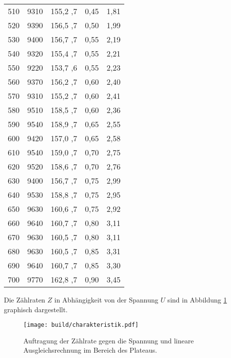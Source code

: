 \begin{table}[htp]
\begin{center}
\begin{tabular}{S[table-format=3.0] S[table-format=4.0,table-figures-uncertainty=3]
       S[table-format=3.1,table-figures-uncertainty=2] S[table-format=1.2] S[table-format=1.2]}
			510 & 9310  & 155,2 ,7 & 0,45 & 1,81\\
			520 & 9390  & 156,5 ,7 & 0,50 & 1,99\\
			530 & 9400  & 156,7 ,7 & 0,55 & 2,19\\
			540 & 9320  & 155,4 ,7 & 0,55 & 2,21\\
			550 & 9220  & 153,7 ,6 & 0,55 & 2,23\\
			560 & 9370  & 156,2 ,7 & 0,60 & 2,40\\
			570 & 9310  & 155,2 ,7 & 0,60 & 2,41\\
			580 & 9510  & 158,5 ,7 & 0,60 & 2,36\\
			590 & 9540  & 158,9 ,7 & 0,65 & 2,55\\
			600 & 9420  & 157,0 ,7 & 0,65 & 2,58\\
			610 & 9540  & 159,0 ,7 & 0,70 & 2,75\\
			620 & 9520  & 158,6 ,7 & 0,70 & 2,76\\
			630 & 9400  & 156,7 ,7 & 0,75 & 2,99\\
			640 & 9530  & 158,8 ,7 & 0,75 & 2,95\\
			650 & 9630  & 160,6 ,7 & 0,75 & 2,92\\
			660 & 9640  & 160,7 ,7 & 0,80 & 3,11\\
			670 & 9630  & 160,5 ,7 & 0,80 & 3,11\\
			680 & 9630  & 160,5 ,7 & 0,85 & 3,31\\
			690 & 9640  & 160,7 ,7 & 0,85 & 3,30\\
			700 & 9770  & 162,8 ,7 & 0,90 & 3,45\\
		\bottomrule
		\end{tabular}
	\end{center}
\end{table}
Die Zählraten $Z$ in Abhängigkeit von der Spannung $U$ sind in Abbildung \ref{fig:plateau}
graphisch dargestellt.

\begin{figure}
  \centering
  \texttt{[image: build/charakteristik.pdf]}
  \caption{Auftragung der Zählrate gegen die Spannung und lineare Ausgleichsrechnung
  im Bereich des Plateaus.}
  \label{fig:plateau}
\end{figure}

